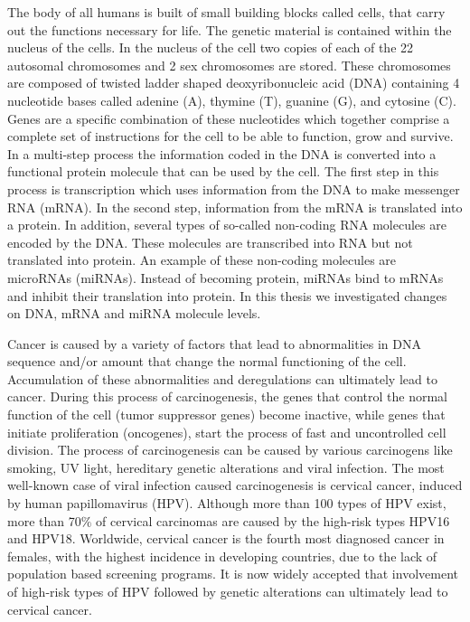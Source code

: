 
\begin{summary}

The body of all humans is built of small building blocks called cells, that carry out the functions necessary for life. The genetic material is contained within the nucleus of the cells. In the nucleus of the cell two copies of each of the 22 autosomal chromosomes and 2 sex chromosomes are stored. These chromosomes are composed of twisted ladder shaped deoxyribonucleic acid (DNA) containing 4 nucleotide bases called adenine (A), thymine (T), guanine (G), and cytosine (C). Genes are a specific combination of these nucleotides which together comprise a complete set of instructions for the cell to be able to function, grow and survive. 
In a multi-step process the information coded in the DNA is converted into a functional protein molecule that can be used by the cell. The first step in this process is transcription which uses information from the DNA to make messenger RNA (mRNA). In the second step, information from the mRNA is translated into a protein. In addition, several types of so-called non-coding RNA molecules are encoded by the DNA. These molecules are transcribed into RNA but not translated into protein. An example of these non-coding molecules are microRNAs (miRNAs). Instead of becoming protein, miRNAs bind to mRNAs and inhibit their translation into protein. In this thesis we investigated changes on DNA, mRNA and miRNA molecule levels. 

Cancer is caused by a variety of factors that lead to abnormalities in DNA sequence and/or amount that change the normal functioning of the cell. Accumulation of these abnormalities and deregulations can ultimately lead to cancer. During this process of carcinogenesis, the genes that control the normal function of the cell (tumor suppressor genes) become inactive, while genes that initiate proliferation (oncogenes), start the process of fast and uncontrolled cell division. The process of carcinogenesis can be caused by various carcinogens like smoking, UV light, hereditary genetic alterations and viral infection. The most well-known case of viral infection caused carcinogenesis is cervical cancer, induced by human papillomavirus (HPV). Although more than 100 types of HPV exist, more than 70$\%$ of cervical carcinomas are caused by the high-risk types HPV16 and HPV18. Worldwide, cervical cancer is the fourth most diagnosed cancer in females, with the highest incidence in developing countries, due to the lack of population based screening programs. It is now widely accepted that involvement of high-risk types of HPV followed by genetic alterations can ultimately lead to cervical cancer.


\end{summary}
